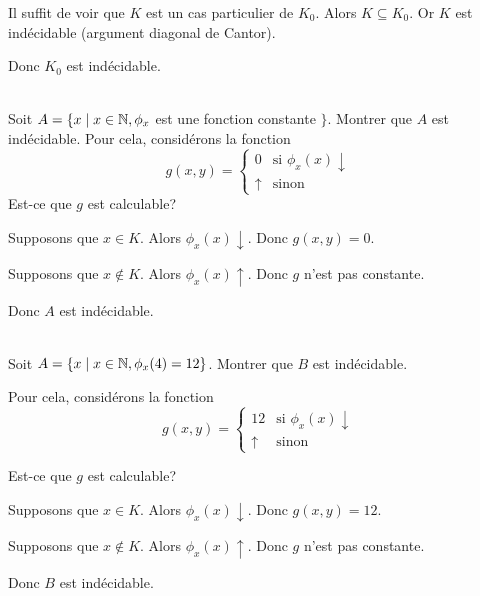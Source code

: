 \documentclass[french,a4paper,10pt]{article}
\begin{document}
    \begin{td-sol}
        Il suffit de voir que $K$ est un cas particulier de $K_0$.
        Alors $K\subseteq K_0$.
        Or $K$ est indécidable (argument diagonal de Cantor).

        Donc $K_0$ est indécidable.
    \end{td-sol}

    \begin{td-exo}\,\\
        Soit $A=\{x\mid x\in \mathbb{N},\phi_x$ est une fonction constante $\}$.
        Montrer que $A$ est indécidable.
        Pour cela, considérons la fonction
        \[
            g(x,y) = \begin{cases}
                0 & \text{si } \phi_x(x) \downarrow\\
                \uparrow & \text{sinon}
            \end{cases}
        \]
        Est-ce que $g$ est calculable?
    \end{td-exo}

    \begin{td-sol}
        Supposons que $x\in K$. Alors $\phi_x(x)\downarrow$. Donc $g(x,y)=0$.

        Supposons que $x\notin K$. Alors $\phi_x(x)\uparrow$. Donc $g$ n'est pas constante.

        Donc $A$ est indécidable.
    \end{td-sol}

    \begin{td-exo}\,\\
        Soit $A=\{x\mid x\in \mathbb{N},\phi_x(4)=12\}$.
        Montrer que $B$ est indécidable.

        Pour cela, considérons la fonction
        \[
            g(x,y) = \begin{cases}
                12 & \text{si } \phi_x(x)\downarrow\\
                \uparrow & \text{sinon}
            \end{cases}
        \]

        Est-ce que $g$ est calculable?
    \end{td-exo}

    \begin{td-sol}
        Supposons que $x\in K$. Alors $\phi_x(x)\downarrow$. Donc $g(x,y)=12$.

        Supposons que $x\notin K$. Alors $\phi_x(x)\uparrow$. Donc $g$ n'est pas constante.

        Donc $B$ est indécidable.
    \end{td-sol}
\end{document}
